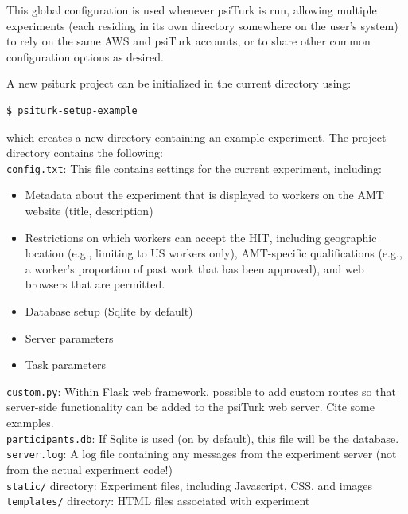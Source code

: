 \documentclass[twocolumn]{svjour3}          %
\begin{document}
This global configuration is used whenever psiTurk is run, allowing multiple experiments (each residing in its own directory somewhere on the user's system) to rely on the same AWS and psiTurk accounts, or to share other common configuration options as desired.

A new psiturk project can be initialized in the current directory using:

\begin{lstlisting}
$ psiturk-setup-example
\end{lstlisting}

\noindent which creates a new directory containing an example experiment.
The project directory contains the following: \\


\noindent \texttt{config.txt}: This file contains settings for the current experiment, including:

\begin{itemize}
\item Metadata about the experiment that is displayed to workers on the AMT website (title, description)
\item Restrictions on which workers can accept the HIT, including geographic location (e.g., limiting to US workers only), AMT-specific qualifications (e.g., a worker's proportion of past work that has been approved), and web browsers that are permitted.
\item Database setup (Sqlite by default)
\item Server parameters
\item Task parameters
\end{itemize}


\noindent \texttt{custom.py}: Within Flask web framework, possible to add custom routes so that server-side functionality can be added to the psiTurk web server.
Cite some examples. \\ 

\noindent \texttt{participants.db}: If Sqlite is used (on by default), this file will be the database. \\

\noindent \texttt{server.log}: A log file containing any messages from the experiment server (not from the actual experiment code!) \\ 

\noindent \texttt{static/} directory: Experiment files, including Javascript, CSS, and images \\

\noindent \texttt{templates/} directory: HTML files associated with experiment \\
\end{document}
